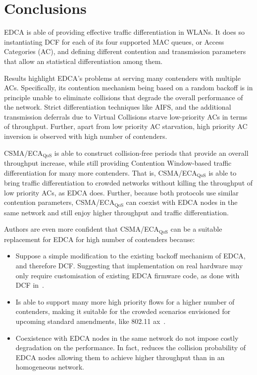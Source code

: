 \documentclass[a4paper]{article}
\begin{document}
\section{Conclusions}\label{section5}
EDCA is able of providing effective traffic differentiation in WLANs. It does so instantiating DCF for each of its four supported MAC queues, or Access Categories (AC), and defining different contention and transmission parameters that allow an statistical differentiation among them. 

Results highlight EDCA's problems at serving many contenders with multiple ACs. Specifically, its contention mechanism being based on a random backoff is in principle unable to eliminate collisions that degrade the overall performance of the network. Strict differentiation techniques like AIFS, and the additional transmission deferrals due to Virtual Collisions starve low-priority ACs in terms of throughput. Further, apart from low priority AC starvation, high priority AC inversion is observed with high number of contenders.

CSMA/ECA$_{\text{QoS}}$ is able to construct collision-free periods that provide an overall throughput increase, while still providing Contention Window-based traffic differentiation for many more contenders. That is, CSMA/ECA$_{\text{QoS}}$ is able to bring traffic differentiation to crowded networks without killing the throughput of low priority ACs, as EDCA does. Further, because both protocols use similar contention parameters, CSMA/ECA$_{\text{QoS}}$ can coexist with EDCA nodes in the same network and still enjoy higher throughput and traffic differentiation.

Authors are even more confident that CSMA/ECA$_\text{QoS}$ can be a suitable replacement for EDCA for high number of contenders because:
	\begin{itemize}
		\item Suppose a simple modification to the existing backoff mechanism of EDCA, and therefore DCF. Suggesting that implementation on real hardware may only require customisation of existing EDCA firmware code, as done with DCF in~\cite{sanabria2014high}.
		\item Is able to support many more high priority flows for a higher number of contenders, making it suitable for the crowded scenarios envisioned for upcoming standard amendments, like 802.11 ax~\cite{IEEE80211ax, bellalta2015WCM}.
		\item Coexistence with EDCA nodes in the same network do not impose costly degradation on the performance. In fact, reduces the collision probability of EDCA nodes allowing them to achieve higher throughput than in an homogeneous network.
	\end{itemize}
	
\end{document}

